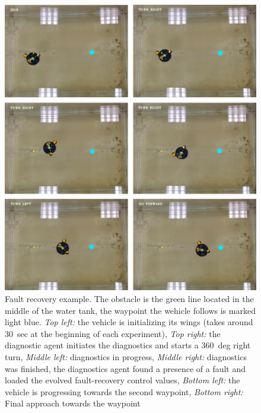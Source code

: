 \begin{figure}
\centering
\includegraphics[width=\textwidth]{Files/Figures/fault_recovery.png}
\caption[Fault recovery example]{Fault recovery example. The obstacle is the green line located in the middle of the water tank, the waypoint the wehicle follows is marked light blue. \textit{Top left:} the vehicle is initializing its wings (takes around 30~sec at the beginning of each experiment), \textit{Top right:} the diagnostic agent initiates the diagnostics and starts a 360~deg right turn, \textit{Middle left:} diagnostics in progress, \textit{Middle right:} diagnostics was finished, the diagnostics agent found a presence of a fault and loaded the evolved fault-recovery control values, \textit{Bottom left:} the vehicle is progressing towards the second waypoint, \textit{Bottom right:} Final approach towards the waypoint}
\label{fig:fault_recovery_pics}
\end{figure}

